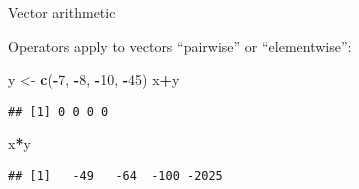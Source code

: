 \documentclass[8pt,ignorenonframetext,]{beamer}
\newenvironment{Shaded}{\begin{snugshade}}{\end{snugshade}}
\newcommand{\KeywordTok}[1]{\textcolor[rgb]{0.13,0.29,0.53}{\textbf{#1}}}
\newcommand{\DecValTok}[1]{\textcolor[rgb]{0.00,0.00,0.81}{#1}}
\newcommand{\StringTok}[1]{\textcolor[rgb]{0.31,0.60,0.02}{#1}}
\newcommand{\OperatorTok}[1]{\textcolor[rgb]{0.81,0.36,0.00}{\textbf{#1}}}
\newcommand{\NormalTok}[1]{#1}
\begin{document}
\begin{frame}[fragile]{Vector arithmetic}

Operators apply to vectors ``pairwise'' or ``elementwise'':

\begin{Shaded}
\begin{Highlighting}[]
\NormalTok{y <-}\StringTok{ }\KeywordTok{c}\NormalTok{(}\OperatorTok{-}\DecValTok{7}\NormalTok{, }\OperatorTok{-}\DecValTok{8}\NormalTok{, }\OperatorTok{-}\DecValTok{10}\NormalTok{, }\OperatorTok{-}\DecValTok{45}\NormalTok{)}
\NormalTok{x}\OperatorTok{+}\NormalTok{y}
\end{Highlighting}
\end{Shaded}

\begin{verbatim}
## [1] 0 0 0 0
\end{verbatim}

\begin{Shaded}
\begin{Highlighting}[]
\NormalTok{x}\OperatorTok{*}\NormalTok{y}
\end{Highlighting}
\end{Shaded}

\begin{verbatim}
## [1]   -49   -64  -100 -2025
\end{verbatim}

\end{frame}
\end{document}
